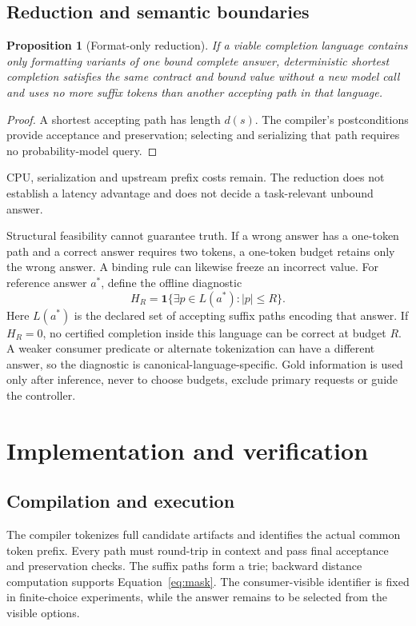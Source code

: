 \documentclass[12pt,a4paper]{article}
\newtheorem{proposition}{Proposition}
\begin{document}
\subsection{Reduction and semantic boundaries}\label{sec:boundaries}
\begin{proposition}[Format-only reduction]\label{prop:reduction}
If a viable completion language contains only formatting variants of one bound complete answer, deterministic shortest completion satisfies the same contract and bound value without a new model call and uses no more suffix tokens than another accepting path in that language.
\end{proposition}
\begin{proof}
A shortest accepting path has length $d(s)$. The compiler's postconditions provide acceptance and preservation; selecting and serializing that path requires no probability-model query.
\end{proof}
CPU, serialization and upstream prefix costs remain. The reduction does not establish a latency advantage and does not decide a task-relevant unbound answer.

Structural feasibility cannot guarantee truth. If a wrong answer has a one-token path and a correct answer requires two tokens, a one-token budget retains only the wrong answer. A binding rule can likewise freeze an incorrect value. For reference answer $a^*$, define the offline diagnostic
\begin{equation}
H_R=\mathbf1\{\exists p\in L(a^*): |p|\le R\}.\label{eq:reference}
\end{equation}
Here $L(a^*)$ is the declared set of accepting suffix paths encoding that answer. If $H_R=0$, no certified completion inside this language can be correct at budget $R$. A weaker consumer predicate or alternate tokenization can have a different answer, so the diagnostic is canonical-language-specific. Gold information is used only after inference, never to choose budgets, exclude primary requests or guide the controller.

\section{Implementation and verification}\label{sec:implementation}
\subsection{Compilation and execution}
The compiler tokenizes full candidate artifacts and identifies the actual common token prefix. Every path must round-trip in context and pass final acceptance and preservation checks. The suffix paths form a trie; backward distance computation supports Equation~\ref{eq:mask}. The consumer-visible identifier is fixed in finite-choice experiments, while the answer remains to be selected from the visible options.
\end{document}
